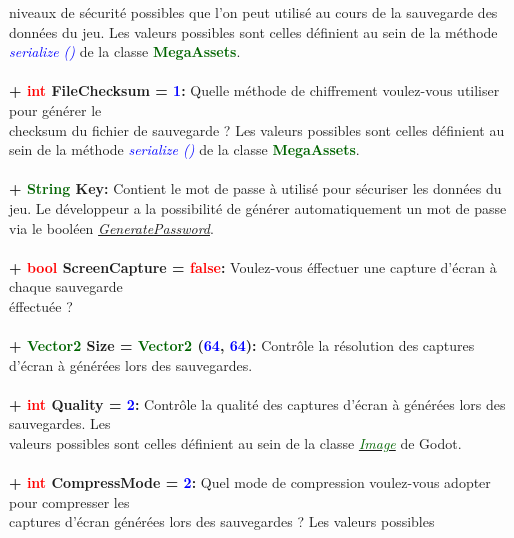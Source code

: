 \documentclass[a4paper, 11pt]{article}
\begin{document}
	niveaux de sécurité possibles que l'on peut utilisé au cours de la sauvegarde des données du jeu. Les
	valeurs possibles sont celles définient au sein de la méthode \textit{\textcolor{blue}{serialize ()}} de 
	la classe \textbf{\textcolor{darkgreen}{MegaAssets}}.\\\\
	\textbf{+ \textcolor{red}{int} FileChecksum = \textcolor{blue}{1}:} Quelle méthode de chiffrement
	voulez-vous utiliser pour générer le \\checksum du fichier de sauvegarde ? Les valeurs possibles sont
	celles définient au sein de la méthode \textit{\textcolor{blue}{serialize ()}} de la classe 
	\textbf{\textcolor{darkgreen}{MegaAssets}}.\\\\
	\textbf{+ \textcolor{darkgreen}{String} \hypertarget{pass}{Key}:} Contient le mot de passe à utilisé
	pour sécuriser les données du jeu. Le développeur a la possibilité de générer automatiquement un mot de
	passe via le booléen \textit{\hyperlink{genpass}{GeneratePassword}}.\\\\
	\textbf{+ \textcolor{red}{bool} ScreenCapture = \textcolor{red}{false}:} Voulez-vous éffectuer une
	capture d'écran à chaque sauvegarde \\éffectuée ?\\\\
	\textbf{+ \textcolor{darkgreen}{Vector2} Size = \textcolor{darkgreen}{Vector2} (\textcolor{blue}{64}, 
	\textcolor{blue}{64}):} Contrôle la résolution des captures d'écran à générées lors des sauvegardes.\\\\
	\textbf{+ \textcolor{red}{int} Quality = \textcolor{blue}{2}:} Contrôle la qualité des captures d'écran
	à générées lors des sauvegardes. Les \\valeurs possibles sont celles définient au sein de la classe
	\href{https://docs.godotengine.org/en/stable/classes/class_image.html#class-image-constant-interpolate-bilinear}{\textit{\textcolor{darkgreen}{Image}}} de Godot.\\\\
	\textbf{+ \textcolor{red}{int} CompressMode = \textcolor{blue}{2}:} Quel mode de compression voulez-vous
	adopter pour compresser les \\captures d'écran générées lors des sauvegardes ? Les valeurs possibles
\end{document}
